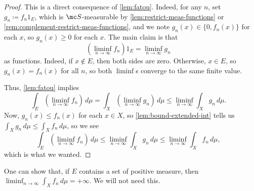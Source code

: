 \documentclass[../notes.tex]{subfiles}
\begin{document}
\begin{proof}
	This is a direct consequence of \autoref{lem:fatou}. Indeed, for any $n$, set $g_n\coloneqq f_n1_E$, which is $\mc S$-measurable by \autoref{lem:restrict-meas-functions} or \autoref{rem:complement-restrict-meas-functions}, and we note $g_n(x)\in\{0,f_n(x)\}$ for each $x$, so $g_n(x)\ge0$ for each $x$. The main claim is that
	\[\left(\liminf_{n\to\infty} f_n\right)1_E=\liminf_{n\to\infty}g_n\]
	as functions. Indeed, if $x\notin E$, then both sides are zero. Otherwise, $x\in E$, so $g_n(x)=f_n(x)$ for all $n$, so both $\liminf$s converge to the same finite value.

	Thus, \autoref{lem:fatou} implies
	\[\int_E\left(\liminf_{n\to\infty} f_n\right)\,d\mu=\int_X\left(\liminf_{n\to\infty}g_n\right)\,d\mu\le\liminf_{n\to\infty}\int_Xg_n\,d\mu.\]
	Now, $g_n(x)\le f_n(x)$ for each $x\in X$, so \autoref{lem:bound-extended-int} tells us $\int_Xg_n\,d\mu\le\int_Xf_n\,d\mu$, so we see
	\[\int_E\left(\liminf_{n\to\infty} f_n\right)\,d\mu\le\liminf_{n\to\infty}\int_Xg_n\,d\mu\le\liminf_{n\to\infty}\int_Xf_n\,d\mu,\]
	which is what we wanted.
\end{proof}
\begin{remark}
	One can show that, if $E$ contains a set of positive measure, then $\liminf_{n\to\infty}\int_Xf_n\,d\mu=+\infty$. We will not need this.
\end{remark}
\end{document}
